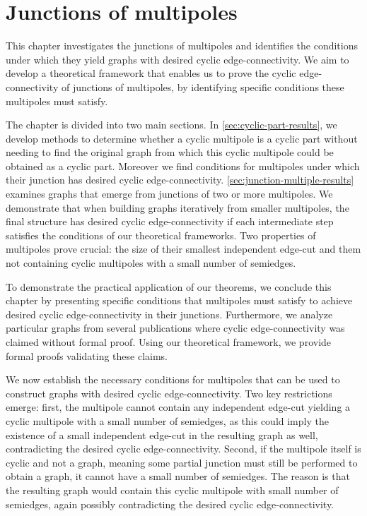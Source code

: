 \documentclass[12pt, twoside]{book}
\begin{document}
\chapter{Junctions of multipoles}\label{ch:junctions-of-multipoles}

This chapter investigates the junctions of multipoles and identifies the conditions under which they yield graphs with desired cyclic edge-connectivity. We aim to develop a theoretical framework that enables us to prove the cyclic edge-connectivity of junctions of multipoles, by identifying specific conditions these multipoles must satisfy.

The chapter is divided into two main sections. In \cref{sec:cyclic-part-results}, we develop methods to determine whether a cyclic multipole is a cyclic part without needing to find the original graph from which this cyclic multipole could be obtained as a cyclic part. Moreover we find conditions for multipoles under which their junction has desired cyclic edge-connectivity. \cref{sec:junction-multiple-results} examines graphs that emerge from junctions of two or more multipoles. We demonstrate that when building graphs iteratively from smaller multipoles, the final structure has desired cyclic edge-connectivity if each intermediate step satisfies the conditions of our theoretical frameworks. Two properties of multipoles prove crucial: the size of their smallest independent edge-cut and them not containing cyclic multipoles with a small number of semiedges.

To demonstrate the practical application of our theorems, we conclude this chapter by presenting specific conditions that multipoles must satisfy to achieve desired cyclic edge-connectivity in their junctions. Furthermore, we analyze particular graphs from several publications \cite{Macajova2006, Kochol1996} where cyclic edge-connectivity was claimed without formal proof. Using our theoretical framework, we provide formal proofs validating these claims.

We now establish the necessary conditions for multipoles that can be used to construct graphs with desired cyclic edge-connectivity. Two key restrictions emerge: first, the multipole cannot contain any independent edge-cut yielding a cyclic multipole with a small number of semiedges, as this could imply the existence of a small independent edge-cut in the resulting graph as well, contradicting the desired cyclic edge-connectivity. Second, if the multipole itself is cyclic and not a graph, meaning some partial junction must still be performed to obtain a graph, it cannot have a small number of semiedges. The reason is that the resulting graph would contain this cyclic multipole with small number of semiedges, again possibly contradicting the desired cyclic edge-connectivity.
\end{document}
